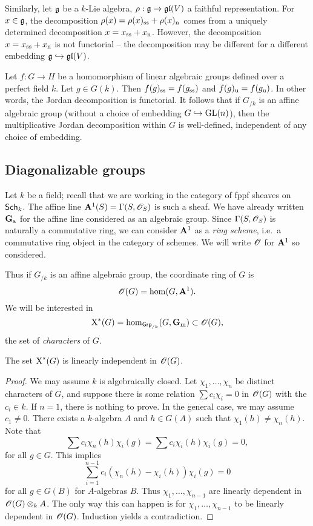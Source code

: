 Similarly, let $\mathfrak{g}$ be a $k$-Lie algebra, $\rho:\mathfrak{g}\to \mathfrak{gl}(V)$ a faithful
representation. For $x\in \mathfrak{g}$, the decomposition 
$\rho(x)=\rho(x)_{\mathrm{ss}}+\rho(x)_{\mathrm{n}}$ comes from a uniquely 
determined decomposition $x=x_{\mathrm{ss}}+x_{\mathrm{n}}$. However, the 
decomposition $x=x_{\mathrm{ss}}+x_{\mathrm{n}}$ is not functorial -- the 
decomposition may be different for a different embedding
$\mathfrak{g}\hookrightarrow \mathfrak{gl}(V)$. 

Let $f:G\to H$ be a homomorphism of linear algebraic groups defined over a 
perfect field $k$. Let $g\in G(k)$. Then 
$f(g)_{\mathrm{ss}}=f(g_{\mathrm{ss}})$ and $f(g)_{\mathrm{u}}=f(g_{\mathrm{u}})$. 
In other words, the Jordan decomposition is functorial. 
It follows that if $G_{/k}$ is an affine algebraic group (without a choice of 
embedding $G\hookrightarrow \operatorname{GL}(n)$), then the multiplicative Jordan 
decomposition within $G$ is well-defined, independent of any choice of 
embedding. 





\subsection{Diagonalizable groups}

Let $k$ be a field; recall that we are working in the category of fppf sheaves 
on $\mathsf{Sch}_{k}$. The affine line $\mathbf{A}^1(S)=\Gamma(S,\mathscr{O}_S)$ is such a sheaf. 
We have already written $\mathbf{G}_\mathrm{a}$ for the affine line considered as an algebraic 
group. Since $\Gamma(S,\mathscr{O}_S)$ is naturally a commutative ring, we can consider 
$\mathbf{A}^1$ as a \emph{ring scheme}, i.e.~a commutative ring object in the category 
of schemes. We will write $\mathscr{O}$ for $\mathbf{A}^1$ so considered. 

Thus if $G_{/k}$ is an affine algebraic group, the coordinate ring of $G$ is 
\[
  \mathscr{O}(G)=\hom(G,\mathbf{A}^1) .
\]
We will be interested in 
\[
  \operatorname{X}^\ast(G) = \hom_{\mathsf{Grp}_{/k}}(G,\mathbf{G}_\mathrm{m}) \subset \mathscr{O}(G) ,
\]
the set of \emph{characters} of $G$. 

\begin{lemma}
The set $\operatorname{X}^\ast(G)$ is linearly independent in $\mathscr{O}(G)$. 
\end{lemma}
\begin{proof}
We may assume $k$ is algebraically closed. Let $\chi_1,\dots,\chi_n$ be 
distinct characters of $G$, and suppose there is some relation 
$\sum c_i \chi_i=0$ in $\mathscr{O}(G)$ with the $c_i\in k$. If $n=1$, there is 
nothing to prove. In the general case, we may assume $c_1\ne 0$. There exists 
a $k$-algebra $A$ and $h\in G(A)$ such that $\chi_1(h)\ne \chi_n(h)$. Note 
that 
\[
  \sum c_i \chi_n(h)\chi_i(g) = \sum c_i \chi_i(h) \chi_i(g) = 0 ,
\]
for all $g\in G$. This implies 
\[
  \sum_{i=1}^{n-1} c_i(\chi_n(h)-\chi_i(h)) \chi_i(g) = 0 
\]
for all $g\in G(B)$ for $A$-algebras $B$. 
Thus $\chi_1,\dots,\chi_{n-1}$ are linearly dependent in 
$\mathscr{O}(G)\otimes_k A$. The only way this can happen is for 
$\chi_1,\dots,\chi_{n-1}$ to be linearly dependent in $\mathscr{O}(G)$. Induction 
yields a contradiction. 
\end{proof}

